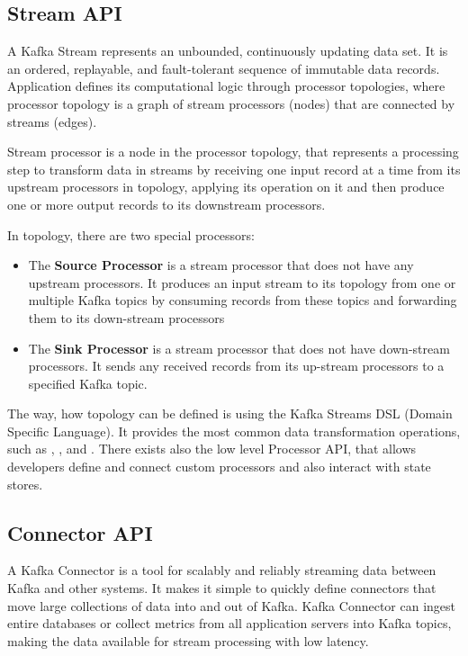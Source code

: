 


\subsection{Stream API \label{frameworks:kafka:streams}}

A Kafka Stream represents an unbounded, continuously updating data set.
It is an ordered, replayable, and fault-tolerant sequence of immutable data records.
Application defines its computational logic through processor topologies,
where processor topology is a graph of stream processors (nodes) that are
connected by streams (edges).

Stream processor is a node in the processor topology, that represents
a processing step to transform data in streams by receiving one
input record at a time from its upstream processors in topology,
applying its operation on it and then produce one or more
output records to its downstream processors.

In topology, there are two special processors:

\begin{itemize}
  \item The \textbf{Source Processor} is a stream processor
    that does not have any upstream processors. It produces an input stream
    to its topology from one or multiple Kafka topics by consuming records
    from these topics and forwarding them to its down-stream processors
  \item The \textbf{Sink Processor} is a stream processor
    that does not have down-stream processors. It sends any received records
    from its up-stream processors to a specified Kafka topic.
\end{itemize}

The way, how topology can be defined is using the Kafka Streams DSL (Domain Specific Language).
It provides the most common data transformation operations, such as
, ,  and .
There exists also the low level Processor API, that allows developers define
and connect custom processors and also interact with state stores.




\subsection{Connector API \label{frameworks:kafka:connector}}

A Kafka Connector is a tool for scalably and reliably streaming data between Kafka
and other systems. It makes it simple to quickly define connectors that move
large collections of data into and out of Kafka.
Kafka Connector can ingest entire databases or collect metrics from all
application servers into Kafka topics, making the data available
for stream processing with low latency.


